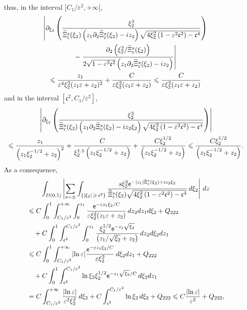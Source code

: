 \documentclass[AHL,Unicode,longabstracts,published]{cedram}
\newcommand*\p{\partial}
\newcommand*\ex{{\sf e}}
\newcommand*\cs{{\mathfrak c}}
\newcommand*\ii{\infty}
\newcommand*\gs{\geqslant }
\newcommand*\ls{\leqslant }
\newcommand*\e{\varepsilon}
\renewcommand*\t{\tilde}
\let\oldtilde\tilde
\renewcommand*{\tilde}[1]{\mathchoice{\widetilde{#1}}{\widetilde{#1}}{\oldtilde{#1}}{\oldtilde{#1}}}
\begin{document}
thus, in the interval $ [C_1 / \e^{2}, +\ii [$,
\begin{multline}\label{IPPrevient3}
\left\lvert \p_{\xi_2} \left(\frac{ \xi_2^3 }{ \t\Xi_\e^s (\xi_2) \left(z_1 \p_2 \t\Xi_\e^s (\xi_2) - i z_2\right) \sqrt{ 4 \xi_2^2\left(1 - \e^2 \cs^2\right) - \cs^4}} \right)\right.
\\
-\left. \frac{ \p_2 \left(\xi_2^2 / \t\Xi_\e^s (\xi_2)\right)}{2 \sqrt{ 1 - \e^2 \cs^2 }\left(z_1 \p_2 \t\Xi_\e^s (\xi_2) - i z_2\right)} \right\rvert\\ 
\ls \frac{ z_1 }{ \e^4 \xi_2^2 (z_1 \e + z_2)^2 } + \frac{ C }{ \e \xi_2^2 (z_1 \e + z_2) }
\ls \frac{ C }{ \e \xi_2^2(z_1 \e + z_2) }
\end{multline}
and in the interval $ [\cs^2, C_1/\e^{2}] $,
\begin{multline*}
\left\lvert \p_{\xi_2} \left(\frac{ \xi_2^3 }{ \t\Xi_\e^s (\xi_2)\left(z_1 \p_2 \t\Xi_\e^s (\xi_2) - i z_2 \xi_2\right) \sqrt{ 4 \xi_2^2 \left(1 - \e^2 \cs^2\right) - \cs^4}}
\right)\right\rvert
\\
\ls \frac{ z_1 }{\left(z_1 \xi_2^{-1/2} + z_2\right)^2 } + \frac{ C }{ \xi_2^{1.5} \left(z_1 \xi_2^{-1/2} + z_2\right) } + \frac{ C \xi_2^{1/2} }{\left(z_1 \xi_2^{-1/2} + z_2\right)}
\ls \frac{ C \xi_2^{1/2} }{\left(z_1 \xi_2^{-1/2} + z_2\right)}.
\end{multline*}
As a consequence,
\begin{multline*}
\int_{D(0,1)}  \left\lvert \sum_{s =\pm } \int_{\left\{ |\xi_2 |\,\gs\,\cs^{2}\right\}} \frac{ s \xi_2^3 \ex^{- |z_1| \t\Xi_\e^s (\xi_2) + i z_2 \xi_2} }{
\t\Xi_\e^s (\xi_2) \sqrt{4 \xi_2^2\left(1 - \e^2 \cs^2\right) - \cs^4}} \, d\xi_2 \right\rvert \, dz
\\
\begin{aligned}
& \ls C \int_0^1 \int_{ C_1 / \e^{2} }^{+\ii} \int_0^{z_1}
\frac{ \ex^{- \e z_1 \xi_2 /C } }{ \e \xi_2^2 (z_1 \e + z_2) } \, dz_2 dz_1 d\xi_2 + Q_{222}
\\ &\quad + C \int_0^1 \int_{\cs^2}^{ C_1 / \e^{2} } \int_0^{z_1}
\frac{ \xi_2^{1/2} \ex^{- z_1 \sqrt{\xi_2}} }{ \left(z_1 / \sqrt{\xi_2} + z_2\right) } \, dz_2 d\xi_2 dz_1
\\ &
\ls C \int_0^1 \int_{ C_1 /\e^{2} }^{+\ii}
\lvert \ln \e \rvert \frac{ \ex^{- \e z_1 \xi_2 /C } }{ \e \xi_2^2 }\, d \xi_2 dz_1 + Q_{222}
\\ & \quad + C \int_0^1 \int_{\cs^2}^{ C_1 / \e^{2} }
\ln \xi_2 \xi_2^{1/2} \ex^{- z_1 \sqrt{\xi_2} /C } \, d\xi_2 dz_1
\\
& = C \int_{C_1/ \e^{2} }^{+\ii}
\frac{ \lvert \ln \e \rvert}{\e^2 \xi_2^3 } \, d \xi_2 + C \int_{\cs^2}^{ C_1 / \e^{2} }
\ln \xi_2 \, d\xi_2 + Q_{222}
\ls C \frac{ \lvert \ln \e \rvert }{ \e^2 } + Q_{222},
\end{aligned}
\end{multline*}
\end{document}
